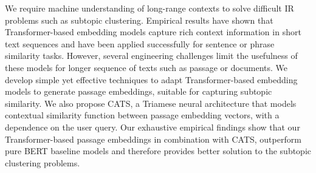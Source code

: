We require machine understanding of long-range contexts to solve difficult IR problems such as subtopic clustering. Empirical results have shown that Transformer-based embedding models capture rich context information in short text sequences and have been applied successfully for sentence or phrase similarity tasks. However, several engineering challenges limit the usefulness of these models for longer sequence of texts such as passage or documents. We develop simple yet effective techniques to adapt Transformer-based embedding models to generate passage embeddings, suitable for capturing subtopic similarity. We also propose CATS, a Triamese neural architecture that models contextual similarity function between passage embedding vectors, with a dependence on the user query. Our exhaustive empirical findings show that our Transformer-based passage embeddings in combination with CATS, outperform pure BERT baseline models and therefore provides better solution to the subtopic clustering problems.